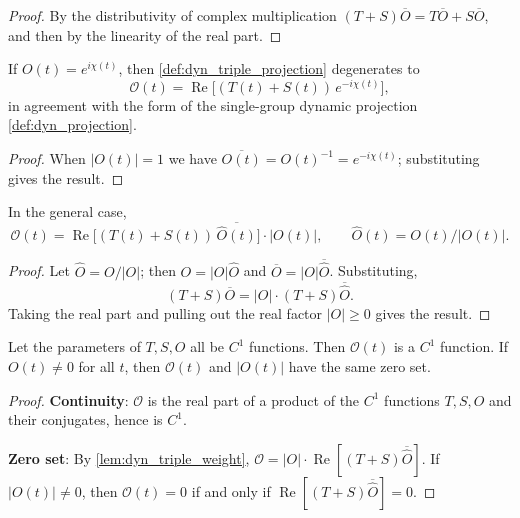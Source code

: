 \begin{proof}
By the distributivity of complex multiplication $(T+S)\overline O=T\overline O+S\overline O$, and then by the linearity of the real part.
\end{proof}

\begin{proposition}\label{prop:dyn_triple_unimodular}
If $O(t)=e^{i\chi(t)}$, then \cref{def:dyn_triple_projection} degenerates to
\[
\mathcal O(t)=\operatorname{Re}\!\big[(T(t)+S(t))\,e^{-i\chi(t)}\big],
\]
in agreement with the form of the single-group dynamic projection \cref{def:dyn_projection}.
\end{proposition}

\begin{proof}
When $|O(t)|=1$ we have $\overline{O(t)}=O(t)^{-1}=e^{-i\chi(t)}$; substituting gives the result.
\end{proof}

\begin{lemma}\label{lem:dyn_triple_weight}
In the general case,
\[
\mathcal O(t)=\operatorname{Re}\!\big[(T(t)+S(t))\,\overline{\widehat O(t)}\big]\cdot|O(t)|,
\qquad \widehat O(t)=O(t)/|O(t)|.
\]
\end{lemma}

\begin{proof}
Let $\widehat O=O/|O|$; then $O=|O|\widehat O$ and $\overline O=|O|\overline{\widehat O}$. Substituting,
\[
(T+S)\overline O=|O|\cdot(T+S)\overline{\widehat O}.
\]
Taking the real part and pulling out the real factor $|O|\ge 0$ gives the result.
\end{proof}

\begin{theorem}\label{thm:dyn_triple_continuity}
Let the parameters of $T,S,O$ all be $C^1$ functions. Then $\mathcal O(t)$ is a $C^1$ function. If $O(t)\neq 0$ for all $t$, then $\mathcal O(t)$ and $|O(t)|$ have the same zero set.
\end{theorem}

\begin{proof}
\textbf{Continuity}: $\mathcal O$ is the real part of a product of the $C^1$ functions $T,S,O$ and their conjugates, hence is $C^1$.

\textbf{Zero set}: By \cref{lem:dyn_triple_weight}, $\mathcal O=|O|\cdot\operatorname{Re}[(T+S)\overline{\widehat O}]$. If $|O(t)|\neq 0$, then $\mathcal O(t)=0$ if and only if $\operatorname{Re}[(T+S)\overline{\widehat O}]=0$.
\end{proof}

